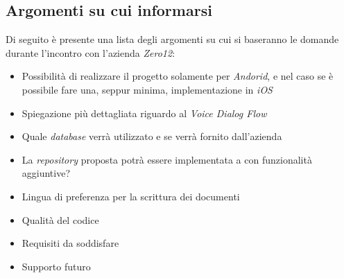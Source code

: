 \documentclass[a4paper,12pt]{article}
\begin{document}
	\subsection{Argomenti su cui informarsi}
	Di seguito è presente una lista degli argomenti su cui si baseranno le domande durante l'incontro con l'azienda \textit{Zero12}:
	\begin{itemize}
		\item Possibilità di realizzare il progetto solamente per \textit{Andorid}, e nel caso se è possibile fare una, seppur minima, implementazione in \textit{iOS}
		\item Spiegazione più dettagliata riguardo al \textit{Voice Dialog Flow}
		\item Quale \textit{database} verrà utilizzato e se verrà fornito dall'azienda
		\item La \textit{repository} proposta potrà essere implementata a con funzionalità aggiuntive?
		\item Lingua di preferenza per la scrittura dei documenti
		\item Qualità del codice
		\item Requisiti da soddisfare
		\item Supporto futuro 
	\end{itemize}
	
	\label{LastPage}
\end{document}
